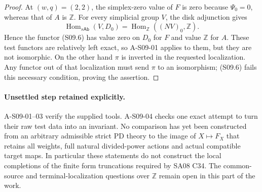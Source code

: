 \begin{proof}
At $(w,q)=(2,2)$, the simplex-zero value of $F$ is zero because
$\Psi_0=0$, whereas that of $A$ is $\mathbb Z$.
For every simplicial group $V$, the disk adjunction gives
\[
 \operatorname{Hom}_{s\mathsf{Ab}}(V,D_0)
 =\operatorname{Hom}_{\mathbb Z}((NV)_0,\mathbb Z).
\]
Hence the functor (S09.6) has value zero on $D_0$ for $F$ and value
$\mathbb Z$ for $A$.  These test functors are relatively left exact,
so A-S09-01 applies to them, but they are not isomorphic.  On the
other hand $\pi$ is inverted in the requested localization.  Any
functor out of that localization must send $\pi$ to an isomorphism;
(S09.6) fails this necessary condition, proving the assertion.
\end{proof}

\paragraph{Unsettled step retained explicitly.}
A-S09-01--03 verify the supplied tools.  A-S09-04 checks one exact
attempt to turn their raw test data into an invariant.  No comparison
has yet been constructed from an arbitrary admissible strict PD
theory to the image of $X\mapsto F_X$ that retains all weights,
full natural divided-power actions and actual compatible target maps.
In particular these statements do not construct the local completions
of the finite form truncations required by SA08 C34.  The common-source
and terminal-localization questions over $\mathbb Z$ remain open in
this part of the work.
